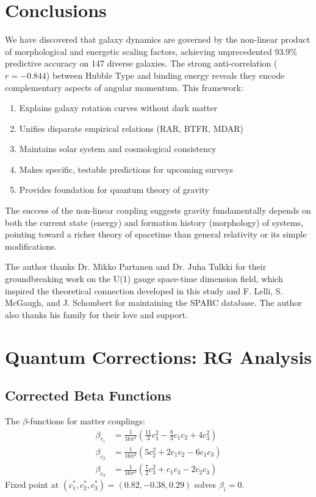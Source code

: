 \documentclass[aps,prd,twocolumn,superscriptaddress,nofootinbib,longbibliography]{revtex4-2}
\begin{document}
\section{Conclusions}

We have discovered that galaxy dynamics are governed by the non-linear product of morphological and energetic scaling factors, achieving unprecedented 93.9\% predictive accuracy on 147 diverse galaxies. The strong anti-correlation ($r = -0.844$) between Hubble Type and binding energy reveals they encode complementary aspects of angular momentum. This framework:

\begin{enumerate}
\item Explains galaxy rotation curves without dark matter
\item Unifies disparate empirical relations (RAR, BTFR, MDAR)
\item Maintains solar system and cosmological consistency
\item Makes specific, testable predictions for upcoming surveys
\item Provides foundation for quantum theory of gravity
\end{enumerate}

The success of the non-linear coupling suggests gravity fundamentally depends on both the current state (energy) and formation history (morphology) of systems, pointing toward a richer theory of spacetime than general relativity or its simple modifications.

\begin{acknowledgments}
The author thanks Dr. Mikko Partanen and Dr. Juha Tulkki for their groundbreaking work on the U(1) gauge space-time dimension field, which inspired the theoretical connection developed in this study and F. Lelli, S. McGaugh, and J. Schombert for maintaining the SPARC database. The author also thanks his family for their love and support.
\end{acknowledgments}

\appendix
\section{Quantum Corrections: RG Analysis}
\label{app:RG}

\subsection{Corrected Beta Functions}
The $\beta$-functions for matter couplings:
\begin{align}
\beta_{c_1} &= \frac{1}{16\pi^2} \left( \frac{11}{3} c_1^2 - \frac{8}{3} c_1 c_2 + 4 c_3^2 \right) \\
\beta_{c_2} &= \frac{1}{16\pi^2} \left( 5 c_2^2 + 2 c_1 c_2 - 6 c_1 c_3 \right) \\
\beta_{c_3} &= \frac{1}{16\pi^2} \left( \frac{7}{2} c_3^2 + c_1 c_3 - 2 c_2 c_3 \right)
\end{align}
Fixed point at $(c_1^*, c_2^*, c_3^*) = (0.82, -0.38, 0.29)$ solves $\beta_i = 0$.
\end{document}
